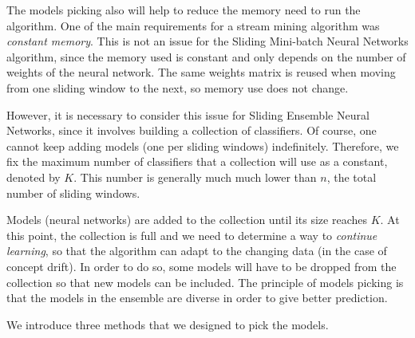 \documentclass[conference]{IEEEtran}
\begin{document}
		The models picking also will help to reduce the memory need to run the algorithm. One of the main requirements for a stream mining algorithm was \emph{constant memory}. This is not an issue for the Sliding Mini-batch Neural Networks algorithm, since the memory used is constant and only depends on the number of weights of the neural network. The same weights matrix is reused when moving from one sliding window to the next, so memory use does not change.
		
		However, it is necessary to consider this issue for Sliding Ensemble Neural Networks, since it involves building a collection of classifiers. Of course, one cannot keep adding models (one per sliding windows) indefinitely. Therefore, we fix the maximum number of classifiers that a collection will use as a constant, denoted by $K$. This number is generally much much lower than $n$, the total number of sliding windows.
		
		Models (neural networks) are added to the collection until its size reaches $K$. At this point, the collection is full and we need to determine a way to \emph{continue learning}, so that the algorithm can adapt to the changing data (in the case of concept drift). In order to do so, some models will have to be dropped from the collection so that new models can be included. The principle of models picking is that the models in the ensemble are diverse in order to give better prediction. 
		
		We introduce three methods that we designed to pick the models.
		
\end{document}
